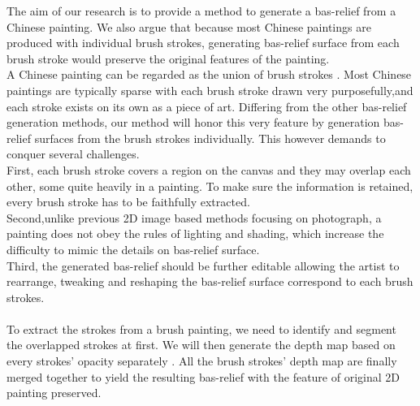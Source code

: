 The aim of our research is to provide a method to generate a bas-relief from a Chinese painting. We also argue that because most Chinese paintings are produced with individual brush strokes, generating bas-relief surface from each brush stroke would preserve the original features of the painting.\\
A Chinese painting can be regarded as the union of brush strokes \cite{xu2006animating}. Most Chinese paintings are typically sparse with each brush stroke drawn very purposefully\cite{smith1997art},and each stroke exists on its own as a piece of art\cite{girshick2004simulating}.
Differing from the other bas-relief generation methods, our method will honor this very feature by generation bas-relief surfaces from the brush strokes individually. 
This however demands to conquer several challenges.\\ 
First, each brush stroke covers a region on the canvas and they may overlap each other, some quite heavily in a painting. To make sure the information is retained, every brush stroke has to be faithfully extracted.\\ Second,unlike previous 2D image based methods focusing on photograph, a painting does not obey the rules of lighting and shading, which increase the difficulty to mimic the details on bas-relief surface. \\Third, the generated bas-relief should be further editable allowing the artist to rearrange, tweaking and reshaping the bas-relief surface correspond to each brush strokes. \\  \\
To extract the strokes from a brush painting, we need to identify and segment the overlapped strokes at first. We will then generate the depth map based on every strokes' opacity separately . All the brush strokes' depth map are finally merged together to yield the resulting bas-relief with the feature of original 2D painting preserved.

